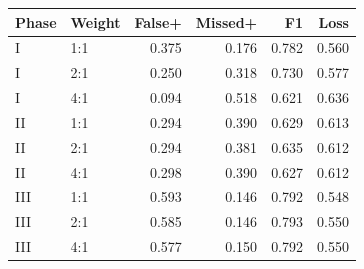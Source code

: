 \begin{tabular}{llrrrr}
\toprule
Phase & Weight & False+ & Missed+ & F1 & Loss \\
\midrule
I & 1:1 & 0.375 & 0.176 & 0.782 & 0.560 \\
I & 2:1 & 0.250 & 0.318 & 0.730 & 0.577 \\
I & 4:1 & 0.094 & 0.518 & 0.621 & 0.636 \\
II & 1:1 & 0.294 & 0.390 & 0.629 & 0.613 \\
II & 2:1 & 0.294 & 0.381 & 0.635 & 0.612 \\
II & 4:1 & 0.298 & 0.390 & 0.627 & 0.612 \\
III & 1:1 & 0.593 & 0.146 & 0.792 & 0.548 \\
III & 2:1 & 0.585 & 0.146 & 0.793 & 0.550 \\
III & 4:1 & 0.577 & 0.150 & 0.792 & 0.550 \\
\bottomrule
\end{tabular}
